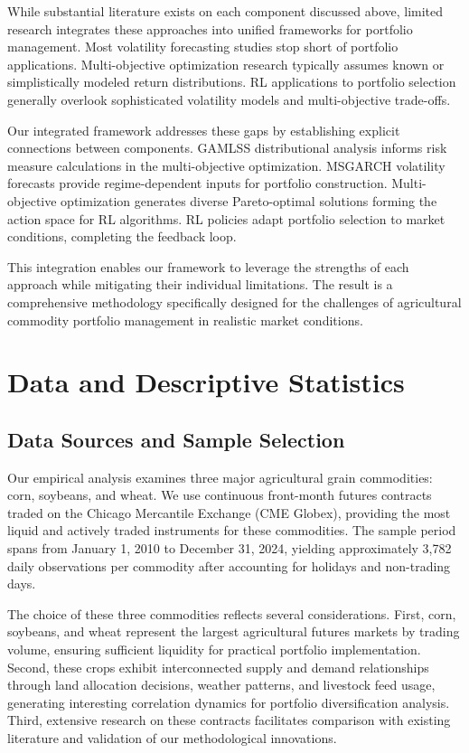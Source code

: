 \documentclass[
  10pt,
  a4paper,
]{article}
\begin{document}
While substantial literature exists on each component discussed above,
limited research integrates these approaches into unified frameworks for
portfolio management. Most volatility forecasting studies stop short of
portfolio applications. Multi-objective optimization research typically
assumes known or simplistically modeled return distributions. RL
applications to portfolio selection generally overlook sophisticated
volatility models and multi-objective trade-offs.

Our integrated framework addresses these gaps by establishing explicit
connections between components. GAMLSS distributional analysis informs
risk measure calculations in the multi-objective optimization. MSGARCH
volatility forecasts provide regime-dependent inputs for portfolio
construction. Multi-objective optimization generates diverse
Pareto-optimal solutions forming the action space for RL algorithms. RL
policies adapt portfolio selection to market conditions, completing the
feedback loop.

This integration enables our framework to leverage the strengths of each
approach while mitigating their individual limitations. The result is a
comprehensive methodology specifically designed for the challenges of
agricultural commodity portfolio management in realistic market
conditions.

\section{Data and Descriptive Statistics}\label{sec-data}

\subsection{Data Sources and Sample
Selection}\label{data-sources-and-sample-selection}

Our empirical analysis examines three major agricultural grain
commodities: corn, soybeans, and wheat. We use continuous front-month
futures contracts traded on the Chicago Mercantile Exchange (CME
Globex), providing the most liquid and actively traded instruments for
these commodities. The sample period spans from January 1, 2010 to
December 31, 2024, yielding approximately 3,782 daily observations per
commodity after accounting for holidays and non-trading days.

The choice of these three commodities reflects several considerations.
First, corn, soybeans, and wheat represent the largest agricultural
futures markets by trading volume, ensuring sufficient liquidity for
practical portfolio implementation. Second, these crops exhibit
interconnected supply and demand relationships through land allocation
decisions, weather patterns, and livestock feed usage, generating
interesting correlation dynamics for portfolio diversification analysis.
Third, extensive research on these contracts facilitates comparison with
existing literature and validation of our methodological innovations.
\end{document}
